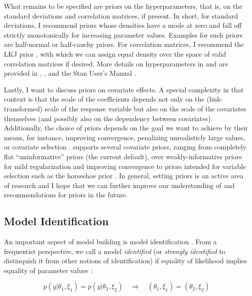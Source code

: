 \documentclass[
]{jss}
\begin{document}
What remains to be specified are priors on the hyperparameters, that is,
on the standard deviations and correlation matrices, if present. In
short, for standard deviations, I recommend priors whose densities have
a mode at zero and fall off strictly monotonically for increasing
parameter values. Examples for such priors are half-normal or
half-cauchy priors. For correlation matrices, I recommend the LKJ prior
\citep{lewandowski2009}, with which we can assign equal density over the
space of valid correlation matrices if desired. More details on
hyperparameters in  and  are provided in
\citet{brms1}, \citet{brms2}, and the Stan User's Manual
\citep{stanM2019}.

Lastly, I want to discuss priors on covariate effects. A special
complexity in that context is that the scale of the coefficients depends
not only on the (link-transformed) scale of the response variable but
also on the scale of the covariates themselves (and possibly also on the
dependency between covariates). Additionally, the choice of priors
depends on the goal we want to achieve by their means, for instance,
improving convergence, penalizing unrealisticly large values, or
covariate selection \citep[see also][]{gelman2017}.  supports
several covariate priors, ranging from completely flat ``uninformative''
priors (the current default), over weakly-informative priors for mild
regularization and improving convergence to priors intended for variable
selection such as the horseshoe prior
\citep{carvalho2010, piironen2017}. In general, setting priors is an
active area of research and I hope that we can further improve our
understanding of and recommendations for priors in the future.

\hypertarget{identification}{%
\subsection{Model Identification}\label{identification}}

An important aspect of model building is model identification
\citep[e.g.,][]{vanderlinden1997}. From a frequentist perspective, we
call a model \emph{identified} (or \emph{strongly identified} to
distinquish it from other notions of identification) if equality of
likelihood implies equality of parameter values
\citep[e.g.,][]{sanmartin2015}:

\begin{equation}
\label{def_identification}
p(y | \theta_1, \xi_1) =  p(y | \theta_2, \xi_2)
\quad \Rightarrow \quad
(\theta_1, \xi_1) = (\theta_2, \xi_2)
\end{equation}
\end{document}
